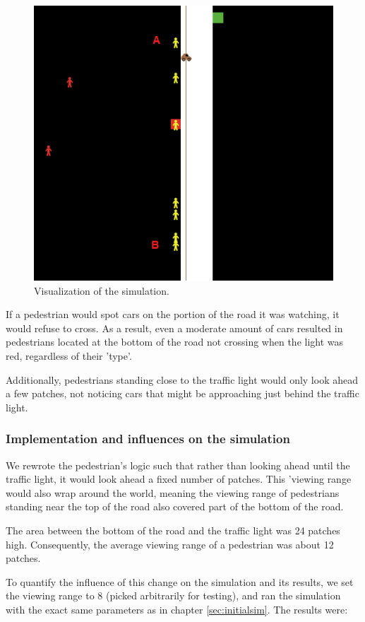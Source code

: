 \documentclass[a4paper]{article}
\begin{document}
\begin{figure}[H]
\centering
\includegraphics[width=.75\textwidth]{socsim1.png}
\caption{Visualization of the simulation.}
\label{ABlabel}
\end{figure}

If a pedestrian would spot cars on the portion of the road it was watching, it would refuse to cross. As a result, even a moderate amount of cars resulted in pedestrians located at the bottom of the road not crossing when the light was red, regardless of their 'type'.

Additionally, pedestrians standing close to the traffic light would only look ahead a few patches, not noticing cars that might be approaching just behind the traffic light.

\subsubsection{Implementation and influences on the simulation}
We rewrote the pedestrian's logic such that rather than looking ahead until the traffic light, it would look ahead a fixed number of patches. This 'viewing range would also wrap around the world, meaning the viewing range of pedestrians standing near the top of the road also covered part of the bottom of the road.

The area between the bottom of the road and the traffic light was 24 patches high. Consequently, the average viewing range of a pedestrian was about 12 patches.

To quantify the influence of this change on the simulation and its results, we set the viewing range to 8 (picked arbitrarily for testing), and ran the simulation with the exact same parameters as in chapter \ref{sec:initialsim}. The results were:
\end{document}
